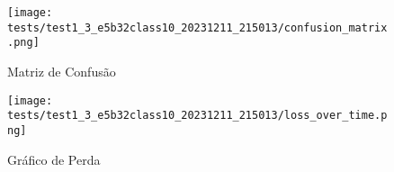 \begin{figure}[ht]
 \begin{center}
   \texttt{[image: tests/test1\_3\_e5b32class10\_20231211\_215013/confusion\_matrix.png]}
  \caption{Matriz de Confusão}
  \label{fig:fig03}
 \end{center}
\end{figure}

\begin{figure}[ht]
 \begin{center}
   \texttt{[image: tests/test1\_3\_e5b32class10\_20231211\_215013/loss\_over\_time.png]}
  \caption{Gráfico de Perda}
  \label{fig:fig04}
 \end{center}
\end{figure}
